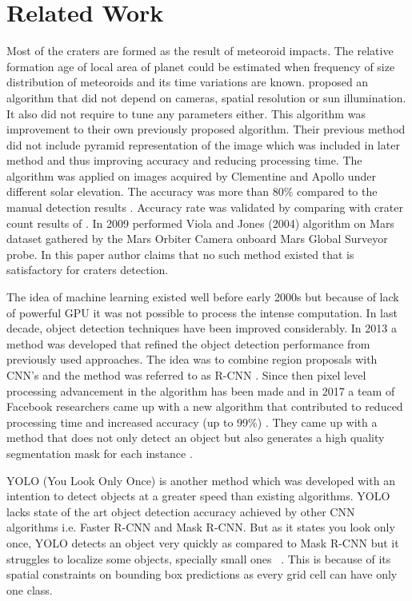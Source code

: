 \documentclass[11pt]{article}
\begin{document}
\section{Related Work}
Most of the craters are formed as the result of meteoroid impacts. The relative formation age of local area of planet could be estimated when frequency of size distribution of meteoroids and its time variations are known. \cite{sawabe_2006} proposed an algorithm that did not depend on cameras, spatial resolution or sun illumination. It also did not require to tune any parameters either. This algorithm was improvement to their own previously proposed algorithm. Their previous method did not include pyramid representation of the image which was included in later method and thus improving accuracy and reducing processing time. The algorithm was applied on images acquired by Clementine and Apollo under different solar elevation. The accuracy was more than 80\% compared to the manual detection results \cite{sawabe_2006}. Accuracy rate was validated by comparing with crater count results of \cite{neukum1975cratering}. In 2009 \cite{martins2009crater} performed Viola and Jones (2004) algorithm on Mars dataset gathered by the Mars Orbiter Camera onboard Mars Global Surveyor probe. In this paper author claims that no such method existed that is satisfactory for craters detection.


The idea of machine learning existed well before early 2000s but because of lack of powerful GPU it was not possible to process the intense computation. In last decade, object detection techniques have been improved considerably. In 2013 a method was developed that refined the object detection performance from previously used approaches. The idea was to combine region proposals with CNN's and the method was referred to as R-CNN \cite{girshick_rich_2013}. Since then pixel level processing advancement in the algorithm has been made and in 2017 a team of Facebook researchers came up with a new algorithm that contributed to reduced processing time and increased accuracy (up to 99\%) \cite{he_mask_2017}. They came up with a method that does not only detect an object but also generates a high quality segmentation mask for each instance \cite{he_mask_2017}. 


YOLO (You Look Only Once) is another method which was developed with an intention to detect objects at a greater speed than existing algorithms. YOLO lacks state of the art object detection accuracy achieved by other CNN algorithms i.e. Faster R-CNN and Mask R-CNN. But as it states you look only once, YOLO detects an object very quickly as compared to Mask R-CNN but it struggles to localize some objects, specially small ones ~\cite{redmon_you_2016}. This is because of its spatial constraints on bounding box predictions as every grid cell can have only one class.
\end{document}
